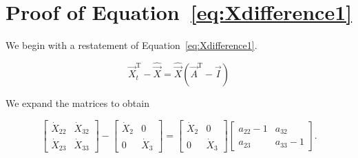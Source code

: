 %
%
%

\chapter{Proof of Equation~\ref{eq:Xdifference1}}
\label{app:Proof} 



We begin with a restatement of Equation~\ref{eq:Xdifference1}.

\begin{equation} \label{eq:Xdifference1Proof-1}
	\vec{X}_{t}^\mathrm{T} 
	- \hat{\vec{X}} 
	= \hat{\vec{X}}(\vec{A}^\mathrm{T} - \vec{I})
\end{equation}

\noindent We expand the matrices to obtain

\begin{equation} \label{eq:Xdifference1Proof-2}
	\begin{bmatrix}
		\dot{X}_{22} & \dot{X}_{32}	\\
		\dot{X}_{23} & \dot{X}_{33}
	\end{bmatrix}
	-
	\begin{bmatrix}
		\dot{X}_{2} & 0	\\
		0           & \dot{X}_{3}
	\end{bmatrix}
	=
	\begin{bmatrix}
		\dot{X}_{2} & 0	\\
		0           & \dot{X}_{3}
	\end{bmatrix}
	\begin{bmatrix}
		a_{22}-1 & a_{32}	\\
		a_{23}   & a_{33}-1
	\end{bmatrix}.
\end{equation}

